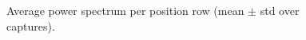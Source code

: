 \begin{figure}[t]
\centering

\caption{Average power spectrum per position row (mean $\pm$ std over captures).}
\label{fig:power_by_position_row}
\end{figure}
